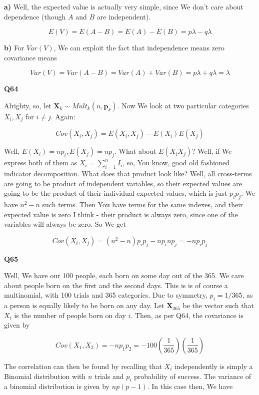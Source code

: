 \documentclass{article}
\begin{document}
			\textbf{a)} Well, the expected value is actually very simple, since We don't care about dependence (though $A$ and $B$ are independent).
			
			\[ E(V) = E(A-B) = E(A)-E(B) = p\lambda - q\lambda \]
			
			\textbf{b)} For $Var(V)$, We can exploit the fact that independence means zero covariance means 
			
			\[ Var(V) = Var(A-B) = Var(A) + Var(B) = p\lambda + q\lambda = \lambda \]
		
			\hfill
			
		\textbf{Q64}
		
			Alrighty, so, let $\bm{X}_k\sim Mult_k(n, \bm{p}_k)$. Now We look at two particular categories $X_i, X_j$ for $i\neq j$. Again:
			
			\[ Cov(X_i, X_j) = E(X_i, X_j) - E(X_i)E(X_j) \]
			
			Well, $E(X_i) = np_i, E(X_j) = np_j$. What about $E(X_iX_j)$? Well, if We express both of them as $X_i = \sum^n_{i=1} I_i$, so, You know, good old fashioned indicator decomposition. What does that product look like? Well, all cross-terms are going to be product of independent variables, so their expected values are going to be the product of their individual expected values, which is just $p_ip_j$. We have $n^2-n$ such terms. Then You have terms for the same indexes, and their expected value is zero I think - their product is always zero, since one of the variables will always be zero. So We get
			
			\[ Cov(X_i, X_j) = (n^2-n)p_ip_j - np_inp_j = -np_ip_j \]
			
			\hfill
			
		\textbf{Q65}
		
			Well, We have our 100 people, each born on some day out of the 365. We care about people born on the first and the second days. This is is of course a multinomial, with 100 trials and 365 categories. Due to symmetry, $p_i = 1/365$, as a person is equally likely to be born on any day. Let $\bm{X}_{365}$ be the vector such that $X_i$ is the number of people born on day $i$. Then, as per Q64, the covariance is given by
			
			\[ Cov(X_1, X_2) = -np_1p_2 = -100\left(\frac{1}{365}\right)\left(\frac{1}{365}\right) \]
			
			The correlation can then be found by recalling that $X_i$ independently is simply a Binomial distribution with $n$ trials and $p_i$ probability of success. The variance of a binomial distribution is given by $np(p-1)$. In this case then, We have
			
\end{document}

